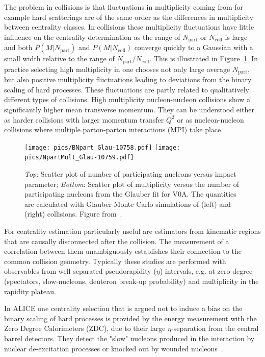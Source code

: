 The problem in \pPb collisions is that fluctuations in multiplicity coming from for example hard scatterings are of the same order as the differences in multiplicity between centrality classes. In \PbPb collisions these multiplicity fluctuations have little influence on the centrality determination as the range of $N_\mathrm{part}$ or $N_\mathrm{coll}$ is large and both $P\left(M|N_\mathrm{part}\right)$ and $P\left(M|N_\mathrm{coll}\right)$ converge quickly to a Gaussian with a small width relative to the range of $N_\mathrm{part}$/$N_\mathrm{coll}$. This is illustrated in Figure~\ref{fig:pPbMult}. In practice selecting high multiplicity in \pPb one chooses not only large average $N_\mathrm{part}$, but also positive multiplicity fluctuations leading to deviations from the binary scaling of hard processes. These fluctuations are partly related to qualitatively different types of collisions. High multiplicity nucleon-nucleon collisions show a significantly higher mean transverse momentum. They can be understood either as harder collisions with larger momentum transfer $Q^2$ or as nucleon-nucleon collisions where multiple parton-parton interactions (MPI) take place. 

\begin{figure}[tb]
\centering
            	\texttt{[image: pics/BNpart\_Glau-10758.pdf]}
            	\texttt{[image: pics/NpartMult\_Glau-10759.pdf]}
                \caption{\emph{Top}: Scatter plot of number of participating nucleons versus impact parameter; \emph{Bottom}: Scatter plot of multiplicity versus the number of participating nucleons from the Glauber fit for V0A. The quantities are calculated with Glauber Monte Carlo simulations of \pPb (left) and \PbPb (right) collisions. Figure from~\cite{Adam:2014qja}.}
	\label{fig:pPbMult}
\end{figure}

For centrality estimation particularly useful are estimators from kinematic regions that are causally disconnected after the collision. The measurement of a correlation between them unambiguously establishes their connection to the common collision geometry. Typically these studies are performed with observables from well separated pseudorapidity ($\eta$) intervals, e.g. at zero-degree (spectators, slow-nucleons, deuteron break-up probability) and multiplicity in the rapidity plateau.

In ALICE one centrality selection that is argued not to induce a bias on the binary scaling of hard processes is provided by the energy measurement with the Zero Degree Calorimeters (ZDC), due to their large $\eta$-separation from the central barrel detectors. They detect the "slow" nucleons produced in the interaction by nuclear de-excitation processes or knocked out by wounded nucleons~\cite{Sikler:2003ef}.


